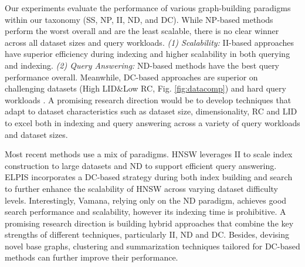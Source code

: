  Our experiments evaluate the performance of various graph-building paradigms within our taxonomy (SS, NP, II, ND, and DC). While NP-based methods perform the worst overall and are the least scalable, there is no clear winner across all dataset sizes and query workloads. \textit{(1) Scalability:} II-based approaches have superior efficiency during indexing and higher scalability in both querying and indexing.
\textit{(2) Query Answering:} ND-based methods have the best query performance overall. 
Meanwhile, DC-based approaches are superior on challenging datasets (High LID\&Low RC, Fig. \ref{fig:datacomp}) and hard query workloads . 
A promising research direction would be to develop techniques that adapt to dataset characteristics such as dataset size, dimensionality, RC and LID to excel both in indexing and query answering across a variety of query workloads and dataset sizes.

  Most recent methods use a mix of paradigms. HNSW leverages II to scale index construction to large datasets and ND to support efficient query answering. ELPIS incorporates a DC-based strategy during both index building and search to further enhance the scalability of HNSW across varying dataset difficulty levels. Interestingly, Vamana, relying only on the ND paradigm, achieves good search performance and scalability, however its indexing time is prohibitive. 
A promising research direction is building hybrid approaches that combine the key strengths of different techniques, particularly II, ND and DC. Besides, devising novel base graphs, clustering and summarization techniques tailored for DC-based methods can further improve their performance.

 

